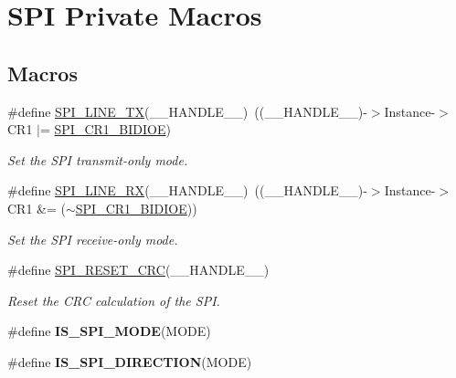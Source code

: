 \hypertarget{group___s_p_i___private___macros}{}\section{S\+PI Private Macros}
\label{group___s_p_i___private___macros}
\subsection*{Macros}
\begin{DoxyCompactItemize}
\item 
\#define \hyperlink{group___s_p_i___private___macros_gae3b2eb5e818e58b66474d42dedac5523}{S\+P\+I\+\_\+L\+I\+N\+E\+\_\+\+TX}(\+\_\+\+\_\+\+H\+A\+N\+D\+L\+E\+\_\+\+\_\+)~((\+\_\+\+\_\+\+H\+A\+N\+D\+L\+E\+\_\+\+\_\+)-\/$>$Instance-\/$>$C\+R1 $\vert$= \hyperlink{group___peripheral___registers___bits___definition_ga378953916b7701bd49f063c0366b703f}{S\+P\+I\+\_\+\+C\+R1\+\_\+\+B\+I\+D\+I\+OE})
\begin{DoxyCompactList}\small\item\em Set the S\+PI transmit-\/only mode. \end{DoxyCompactList}\item 
\#define \hyperlink{group___s_p_i___private___macros_gaa8d58cef91c1874d5a4dde4014cf6269}{S\+P\+I\+\_\+L\+I\+N\+E\+\_\+\+RX}(\+\_\+\+\_\+\+H\+A\+N\+D\+L\+E\+\_\+\+\_\+)~((\+\_\+\+\_\+\+H\+A\+N\+D\+L\+E\+\_\+\+\_\+)-\/$>$Instance-\/$>$C\+R1 \&= ($\sim$\hyperlink{group___peripheral___registers___bits___definition_ga378953916b7701bd49f063c0366b703f}{S\+P\+I\+\_\+\+C\+R1\+\_\+\+B\+I\+D\+I\+OE}))
\begin{DoxyCompactList}\small\item\em Set the S\+PI receive-\/only mode. \end{DoxyCompactList}\item 
\#define \hyperlink{group___s_p_i___private___macros_gab120a0085b72939e7d19c4f6b3381a99}{S\+P\+I\+\_\+\+R\+E\+S\+E\+T\+\_\+\+C\+RC}(\+\_\+\+\_\+\+H\+A\+N\+D\+L\+E\+\_\+\+\_\+)
\begin{DoxyCompactList}\small\item\em Reset the C\+RC calculation of the S\+PI. \end{DoxyCompactList}\item 
\#define {\bfseries I\+S\+\_\+\+S\+P\+I\+\_\+\+M\+O\+DE}(M\+O\+DE)
\item 
\#define {\bfseries I\+S\+\_\+\+S\+P\+I\+\_\+\+D\+I\+R\+E\+C\+T\+I\+ON}(M\+O\+DE)
\item 

\end{DoxyCompactItemize}
